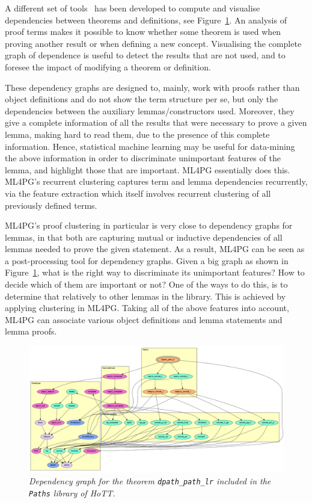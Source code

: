A different set of tools~\cite{dpdgraph,BPP00} has been developed to compute and visualise dependencies between theorems and definitions, see Figure~\ref{fig:dgraph1}. An analysis of proof terms makes it possible to know whether some theorem is used when proving another result or when defining a new concept. Visualising the complete graph of dependence is useful to detect the results that are not used, and to foresee the impact of modifying a theorem or definition.  

These dependency graphs are designed to, mainly, work with proofs rather than object definitions and do not show the term structure per se,
but only the dependencies between the auxiliary lemmas/constructors used. Moreover, they give a complete information of all the results that were necessary to prove a given lemma, making hard to read them, due to the presence of this complete information. Hence,  statistical machine learning may be useful for data-mining the above information in order to discriminate unimportant features of the
lemma, and highlight those that are important. ML4PG essentially does this. ML4PG's recurrent clustering  captures term and lemma dependencies recurrently, via the feature extraction which itself involves recurrent clustering of all previously
defined terms. 


ML4PG's proof clustering in particular is very close to dependency graphs for lemmas, in that both are capturing mutual or inductive dependencies of all lemmas needed to prove the given statement. As a result, ML4PG can be seen as a post-processing tool for dependency
graphs. Given a big graph as shown in Figure~\ref{fig:dgraph1}, what is the right way to discriminate its unimportant features? How to decide which of them are important or not? One of the ways to do this, is to determine that relatively to other lemmas in the library. This is achieved by applying clustering in ML4PG. Taking all of the above features into account, ML4PG can associate various object definitions
and lemma statements and lemma proofs. 

\begin{figure}
\centering
\includegraphics[scale=.15]{graph_dpath_path_lr.png}
\caption{\scriptsize{\emph{Dependency graph for the theorem \texttt{dpath\_path\_lr} included in the \texttt{Paths} library of HoTT.}}}\label{fig:dgraph1}
\end{figure}

